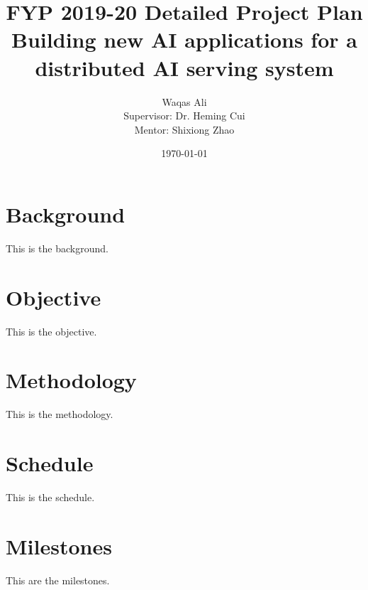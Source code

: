 \documentclass{article}
\title{FYP 2019-20 Detailed Project Plan \\ Building new AI applications for a distributed AI serving system}
\author{Waqas Ali\\{\small Supervisor: Dr. Heming Cui}\\{\small Mentor: Shixiong Zhao}}
\date{\today}
\begin{document}
\maketitle
 
\section{Background}
This is the background.

\section{Objective}
This is the objective.

\section{Methodology}
This is the methodology.

\section{Schedule}
This is the schedule.

\section{Milestones}
This are the milestones.
\end{document}
